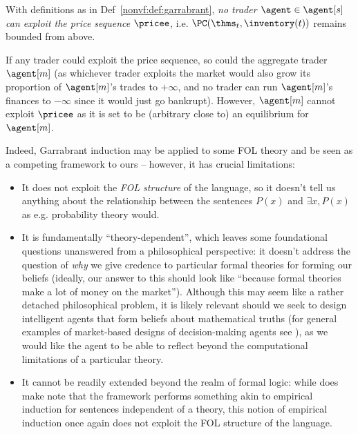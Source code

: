 \begin{subappendices}
\begin{theorem}[Inexploitability]
    With definitions as in Def~\ref{nonvf:def:garrabrant}, \emph{no trader $\agent\in\agent[s]$ can exploit the price sequence $\pricee$}, i.e. $\PC(\thms_t,\inventory(t))$ remains bounded from above.
    \label{nonvf:thm:garrabrant}
\end{theorem}

\begin{hproof}
    If any trader could exploit the price sequence, so could the aggregate trader $\agent[m]$ (as whichever trader exploits the market would also grow its proportion of $\agent[m]$'s trades to $+\infty$, and no trader can run $\agent[m]$'s finances to $-\infty$ since it would just go bankrupt). However, $\agent[m]$ cannot exploit $\pricee$ as it is set to be (arbitrary close to) an equilibrium for $\agent[m]$.
\end{hproof}

Indeed, Garrabrant induction may be applied to some FOL theory and be seen as a competing framework to ours -- however, it has crucial limitations:
\begin{itemize}
    \item It does not exploit the \emph{FOL structure} of the language, so it doesn't tell us anything about the relationship between the sentences $P(x)$ and $\exists x, P(x)$ as e.g. probability theory would.
    \item It is fundamentally ``theory-dependent'', which leaves some foundational questions unanswered from a philosophical perspective: it doesn't address the question of \emph{why} we give credence to particular formal theories for forming our beliefs (ideally, our answer to this should look like ``because formal theories make a lot of money on the market''). Although this may seem like a rather detached philosophical problem, it is likely relevant should we seek to design intelligent agents that form beliefs about mathematical truths (for general examples of market-based designs of decision-making agents see \citet{oesterheldTheoryBoundedInductive2023, changDecentralizedReinforcementLearning2020, kweeMarketBasedReinforcementLearning2001, baumModelIntelligenceEconomy1999, balduzziCorticalPredictionMarkets2014}), as we would like the agent to be able to reflect beyond the computational limitations of a particular theory.
    \item It cannot be readily extended beyond the realm of formal logic: while \citet{garrabrantLogicalInduction2016} does make note that the framework performs something akin to empirical induction for sentences independent of a theory, this notion of empirical induction once again does not exploit the FOL structure of the language.
\end{itemize}

\end{subappendices}
